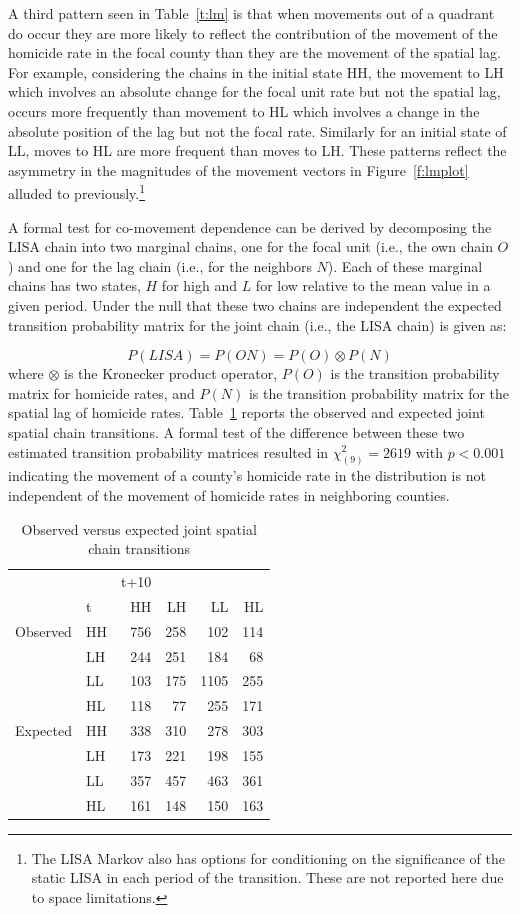 \documentclass[11pt, titlepage]{amsart}
\begin{document}
A third pattern seen in Table~\ref{t:lm} is that when movements out of a
quadrant do occur they are more likely to reflect the contribution of
the movement of the homicide rate in the focal county than they are the
movement of the spatial lag. For example, considering the chains in the
initial state HH, the movement to LH which involves an absolute change
for the focal unit rate but not the spatial lag, occurs more frequently
than movement to HL which involves a change in the absolute position of
the lag but not the focal rate. Similarly for an initial state of LL,
moves to HL are more frequent than moves to LH. These patterns reflect
the asymmetry in the magnitudes of the movement vectors in
Figure~\ref{f:lmplot} alluded to previously.\footnote{The LISA Markov
also has options for conditioning on the significance of the static LISA
in each period of the transition. These are not reported here due to
space limitations.}

A formal test for co-movement dependence can be derived by decomposing
the LISA chain into two marginal chains, one for the focal unit (i.e.,
the own chain $O$) and one for the lag chain (i.e., for the neighbors
$N$). Each of these marginal chains has two states, $H$ for high and $L$
for low relative to the mean value in a given period. Under the null that these two chains are independent the expected
transition probability matrix for the joint chain (i.e., the LISA chain)
is given as:

\begin{equation}
	P(LISA) = P(ON) = P(O) \otimes P(N)
\end{equation}
where $\otimes$ is the Kronecker product operator, $P(O)$ is the
transition probability matrix for homicide rates, and $P(N)$ is the
transition probability matrix for the spatial lag of homicide rates.
Table~\ref{t:jc} reports the observed and expected joint spatial chain
transitions. A formal test of the difference between these two estimated
transition probability matrices resulted in $\chi_{(9)}^2 = 2619$ with
$p<0.001$ indicating the movement of a county's homicide rate in the
distribution is not independent of the movement of homicide rates in
neighboring counties.


\begin{table}
  \centering
  \small
\begin{tabular}{|ll|rrrr|}\hline
        &  &t+10&&&\\
&t&HH&LH&LL&HL\\
\hline
Observed&HH&756 &258 &102 &114\\
&LH&244 &251 &184 &68\\
&LL&103 &175 &1105 &255\\
&HL&118 &77  &255 &171\\
\hline
Expected&HH&338 &310 &278 &303\\
&LH&173 &221 &198 &155\\
&LL&357 &457 &463 &361\\
&HL&161 &148 &150 &163\\
\hline
\end{tabular}
\caption{Observed versus expected joint spatial chain transitions}
\label{t:jc}
\end{table}
\end{document}
